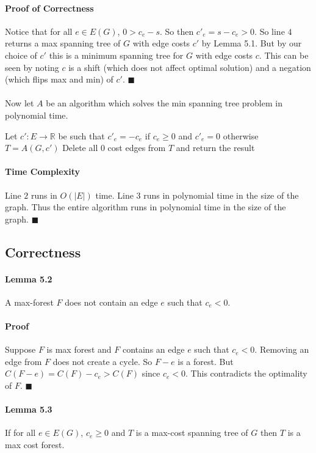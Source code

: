 \documentclass[letterpaper,12pt,oneside,onecolumn]{report}
\begin{document}
\paragraph{Proof of Correctness}
Notice that for all $e \in E(G)$, $0 > c_e -s$. So then $c'_e = s - c_e > 0$. So line $4$ returns a max spanning tree of $G$ with edge costs $c'$ by Lemma 5.1. But by our choice of $c'$ this is a minimum spanning tree for $G$ with edge costs $c$. This can be seen by noting $c$ is a shift (which does not affect optimal solution) and a negation (which flips max and min) of $c'$. $\blacksquare$
\paragraph{}
Now let $A$ be an algorithm which solves the min spanning tree problem in polynomial time.
\begin{algorithm} \begin{algorithmic}[1]
\Procedure{}{}
\State Let $c' : E \rightarrow \mathbb{R}$ be such that $c'_e = -c_e$ if $c_e \geq 0$ and $c'_e = 0$ otherwise
\State $T = A(G,c')$
\State Delete all $0$ cost edges from $T$ and return the result
\EndProcedure
\end{algorithmic} \end{algorithm}
\paragraph{Time Complexity}
Line $2$ runs in $O(|E|)$ time. Line $3$ runs in polynomial time in the size of the graph. Thus the entire algorithm runs in polynomial time in the size of the graph. $\blacksquare$
\subsection*{Correctness}
\paragraph{Lemma 5.2}
A max-forest $F$ does not contain an edge $e$ such that $c_e < 0$.
\paragraph{Proof}
Suppose $F$ is max forest and $F$ contains an edge $e$ such that $c_e < 0$. Removing an edge from $F$ does not create a cycle. So $F - e$ is a forest. But $C(F - e) = C(F) - c_e > C(F)$ since $c_e < 0$. This contradicts the optimality of $F$. $\blacksquare$
\paragraph{Lemma 5.3}
If for all $e \in E(G)$, $c_e \geq 0$ and $T$ is a max-cost spanning tree of $G$ then $T$ is a max cost forest.
\end{document}
